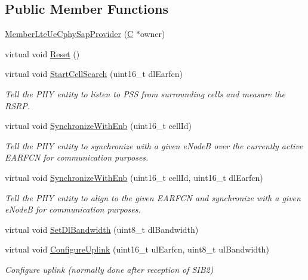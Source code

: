 \subsection*{Public Member Functions}
\begin{DoxyCompactItemize}
\item 
\hyperlink{classns3_1_1MemberLteUeCphySapProvider_ad91e5e633e8d38e64d9fb580e88fb3ff}{Member\+Lte\+Ue\+Cphy\+Sap\+Provider} (\hyperlink{loss__COST231__small__cities__urban_8m_aaa53ca0b650dfd85c4f59fa156f7a2cc}{C} $\ast$owner)
\item 
virtual void \hyperlink{classns3_1_1MemberLteUeCphySapProvider_af42934758f64c10935b1834e06ccd21c}{Reset} ()
\item 
virtual void \hyperlink{classns3_1_1MemberLteUeCphySapProvider_a074a244eaef70304efc84caebeaf5f68}{Start\+Cell\+Search} (uint16\+\_\+t dl\+Earfcn)
\begin{DoxyCompactList}\small\item\em Tell the P\+HY entity to listen to P\+SS from surrounding cells and measure the R\+S\+RP. \end{DoxyCompactList}\item 
virtual void \hyperlink{classns3_1_1MemberLteUeCphySapProvider_a6fa7eabed9ea38f6d8ae871606f0b934}{Synchronize\+With\+Enb} (uint16\+\_\+t cell\+Id)
\begin{DoxyCompactList}\small\item\em Tell the P\+HY entity to synchronize with a given e\+NodeB over the currently active E\+A\+R\+F\+CN for communication purposes. \end{DoxyCompactList}\item 
virtual void \hyperlink{classns3_1_1MemberLteUeCphySapProvider_abb7d1c5863a0800122e00ad629dd83da}{Synchronize\+With\+Enb} (uint16\+\_\+t cell\+Id, uint16\+\_\+t dl\+Earfcn)
\begin{DoxyCompactList}\small\item\em Tell the P\+HY entity to align to the given E\+A\+R\+F\+CN and synchronize with a given e\+NodeB for communication purposes. \end{DoxyCompactList}\item 
virtual void \hyperlink{classns3_1_1MemberLteUeCphySapProvider_a9b75c6730ceadc9b53c38307e8992398}{Set\+Dl\+Bandwidth} (uint8\+\_\+t dl\+Bandwidth)
\item 
virtual void \hyperlink{classns3_1_1MemberLteUeCphySapProvider_a4c61ff7a88e893ada81acaca325bfa61}{Configure\+Uplink} (uint16\+\_\+t ul\+Earfcn, uint8\+\_\+t ul\+Bandwidth)
\begin{DoxyCompactList}\small\item\em Configure uplink (normally done after reception of S\+I\+B2) \end{DoxyCompactList}\item 

\end{DoxyCompactItemize}
